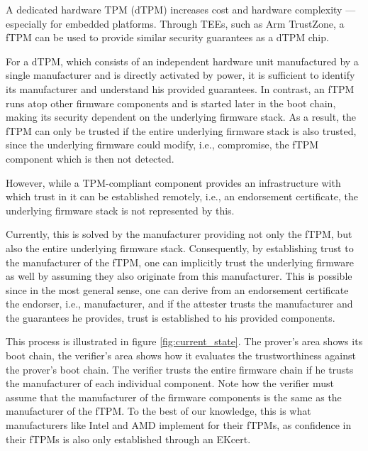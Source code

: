 A dedicated hardware TPM (dTPM) increases cost and hardware complexity --- especially for embedded platforms.
Through \acp{TEE}, such as Arm TrustZone, a \ac{fTPM} can be used to provide similar security guarantees as a dTPM chip.


For a dTPM, which consists of an independent hardware unit manufactured by a single manufacturer and is directly activated by power, it is sufficient to identify its manufacturer and understand his provided guarantees.
In contrast, an \ac{fTPM} runs atop other firmware components and is started later in the boot chain, making its security dependent on the underlying firmware stack.
As a result, the fTPM can only be trusted if the entire underlying firmware stack is also trusted, since the underlying firmware could modify, i.e., compromise, the fTPM component which is then not detected.


However, while a TPM-compliant component provides an infrastructure with which trust in it can be established remotely, i.e., an endorsement certificate, the underlying firmware stack is not represented by this.


Currently, this is solved by the manufacturer providing not only the fTPM, but also the entire underlying firmware stack.
Consequently, by establishing trust to the manufacturer of the fTPM, one can implicitly trust the underlying firmware as well by assuming they also originate from this manufacturer.
This is possible since in the most general sense, one can derive from an endorsement certificate the endorser, i.e., manufacturer, and if the attester trusts the manufacturer and the guarantees he provides, trust is established to his provided components.



This process is illustrated in figure \autoref{fig:current_state}.
The prover's area shows its boot chain, the verifier's area shows how it evaluates the trustworthiness against the prover's boot chain.
The verifier trusts the entire firmware chain if he trusts the manufacturer of each individual component.
Note how the verifier must assume that the manufacturer of the firmware components is the same as the manufacturer of the fTPM\@.
To the best of our knowledge, this is what manufacturers like Intel and AMD implement for their \acp{fTPM}, as confidence in their \acp{fTPM} is also only established through an EKcert.

